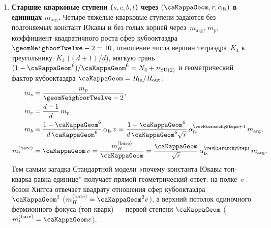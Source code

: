 \begin{enumerate}[leftmargin=*]
\item \textbf{Старшие кварковые ступени ($s,c,b,t$) через $(\caKappaGeom,r,\alpha_{\mathrm{fs}})$ в единицах $m_{\arg}$.}
  Четыре тяжёлые кварковые ступени задаются без подгоняемых констант Юкавы и без голых корней через~$m_{\arg}$, $m_p$,
  коэффициент квадратичного роста сфер кубооктаэдра $\geomNeighborTwelve-2=10$,
  отношение числа вершин тетраэдра~$K_4$ к треугольнику~$K_3$ ($(d+1)/d$),
  мягкую грань $(1-\caKappaGeom^6)/\caKappaGeom^6=N_4+n_{\mathrm{SU}(2)}$ и геометрический фактор кубооктаэдра $\caKappaGeom=R_{\mathrm{in}}/R_{\mathrm{out}}$:
  \begin{align}
    m_s &= \frac{m_p}{\geomNeighborTwelve-2},\\
    m_c &= \frac{d+1}{d}\,m_p,\\
    m_b &= \frac{1-\caKappaGeom^6}{d\,\caKappaGeom^6}\,\alpha_{\mathrm{fs}}\,v
      = \frac{1-\caKappaGeom^6}{d\,\caKappaGeom^6\sqrt{r}}\,\alpha_{\mathrm{fs}}^{\vevHierarchySteps+1}\,m_{\arg},\\
    m_t^{(\mathrm{bare})} &= \caKappaGeom\,v = \frac{m_H^{(\mathrm{bare})}}{\caKappaGeom}
      = \frac{\caKappaGeom}{\sqrt{r}}\,\alpha_{\mathrm{fs}}^{\vevHierarchySteps}\,m_{\arg}.
  \end{align}
  Тем самым загадка Стандартной модели «почему константа Юкавы топ-кварка равна единице''
  получает прямой геометрический ответ: на полке~$v$ бозон Хиггса отвечает квадрату отношения сфер кубооктаэдра
  $\caKappaGeom^2$ ($m_H^{(\mathrm{bare})}=\caKappaGeom^2 v$),
  а верхний потолок одиночного фермионного фокуса (топ-кварк) --- первой степени $\caKappaGeom$
  ($m_t^{(\mathrm{bare})}=\caKappaGeom v$).


\end{enumerate}
